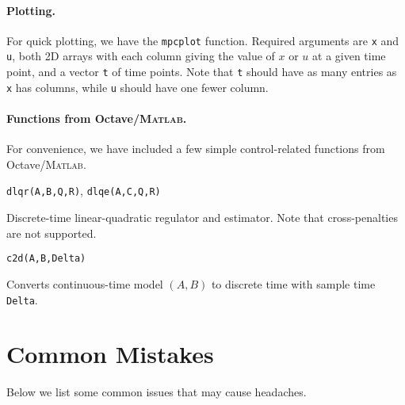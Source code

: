 \documentclass{article}
\newcommand{\funcname}[2][.25em]{\vspace{#1}\noindent\texttt{#2}\nopagebreak\vspace{#1}}
\begin{document}
\begin{multicols}{2}
\paragraph{Plotting.}

For quick plotting, we have the \texttt{mpcplot} function.
Required arguments are \texttt{x} and \texttt{u}, both 2D arrays with each column giving the value of $x$ or $u$ at a given time point, and a vector \texttt{t} of time points.
Note that \texttt{t} should have as many entries as \texttt{x} has columns, while \texttt{u} should have one fewer column.

\paragraph*{Functions from Octave/\textsc{Matlab}.}

For convenience, we have included a few simple control-related functions from Octave/\textsc{Matlab}.

\funcname{dlqr(A,B,Q,R)}, \funcname[0pt]{dlqe(A,C,Q,R)}

Discrete-time linear-quadratic regulator and estimator.
Note that cross-penalties are not supported.

\funcname{c2d(A,B,Delta)}

Converts continuous-time model $(A,B)$ to discrete time with sample time \texttt{Delta}.

\end{multicols}

\section{Common Mistakes}

Below we list some common issues that may cause headaches.
\end{document}
